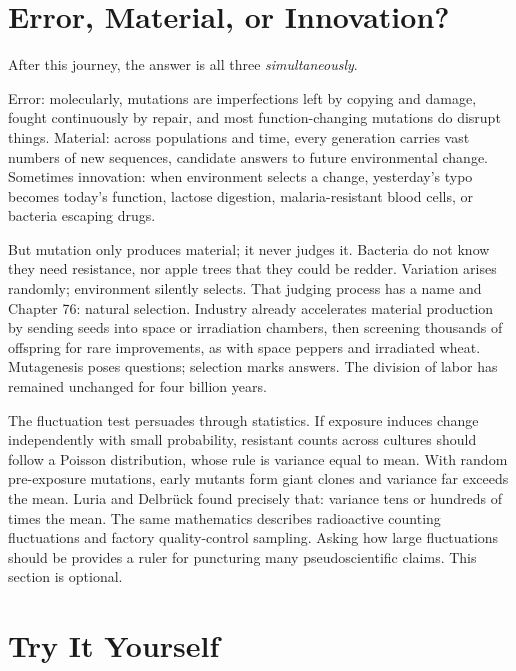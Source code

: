 \section{Error, Material, or Innovation?}

After this journey, the answer is all three \emph{simultaneously}.

Error: molecularly, mutations are imperfections left by copying and damage, fought continuously by repair, and most function-changing mutations do disrupt things. Material: across populations and time, every generation carries vast numbers of new sequences, candidate answers to future environmental change. Sometimes innovation: when environment selects a change, yesterday's typo becomes today's function, lactose digestion, malaria-resistant blood cells, or bacteria escaping drugs.

But mutation only produces material; it never judges it. Bacteria do not know they need resistance, nor apple trees that they could be redder. Variation arises randomly; environment silently selects. That judging process has a name and Chapter 76: natural selection. Industry already accelerates material production by sending seeds into space or irradiation chambers, then screening thousands of offspring for rare improvements, as with space peppers and irradiated wheat. Mutagenesis poses questions; selection marks answers. The division of labor has remained unchanged for four billion years.

\begin{tiaozhan}
The fluctuation test persuades through statistics. If exposure induces change independently with small probability, resistant counts across cultures should follow a Poisson distribution, whose rule is variance equal to mean. With random pre-exposure mutations, early mutants form giant clones and variance far exceeds the mean. Luria and Delbrück found precisely that: variance tens or hundreds of times the mean. The same mathematics describes radioactive counting fluctuations and factory quality-control sampling. Asking how large fluctuations should be provides a ruler for puncturing many pseudoscientific claims. This section is optional.
\end{tiaozhan}

\section*{Try It Yourself}

